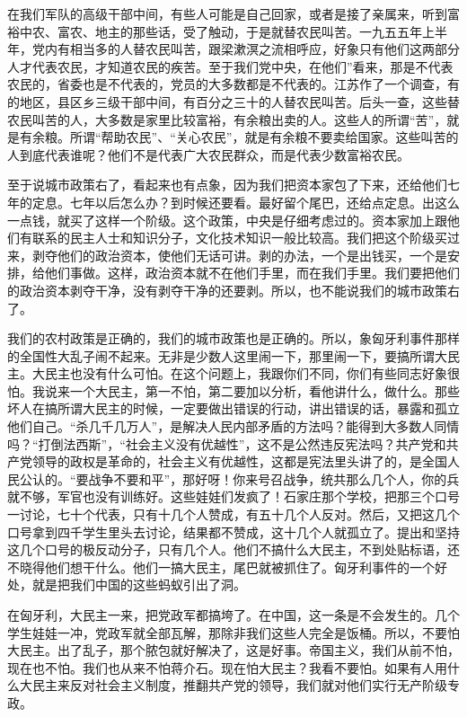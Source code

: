 在我们军队的高级干部中间，有些人可能是自己回家，或者是接了亲属来，听到富裕中农、富农、地主的那些话，受了触动，于是就替农民叫苦。一九五五年上半年，党内有相当多的人替农民叫苦，跟梁漱溟之流相呼应，好象只有他们这两部分人才代表农民，才知道农民的疾苦。至于我们党中央，在他们”看来，那是不代表农民的，省委也是不代表的，党员的大多数都是不代表的。江苏作了一个调查，有的地区，县区乡三级干部中间，有百分之三十的人替农民叫苦。后头一查，这些替农民叫苦的人，大多数是家里比较富裕，有余粮出卖的人。这些人的所谓“苦”，就是有余粮。所谓“帮助农民”、“关心农民”，就是有余粮不要卖给国家。这些叫苦的人到底代表谁呢？他们不是代表广大农民群众，而是代表少数富裕农民。

至于说城市政策右了，看起来也有点象，因为我们把资本家包了下来，还给他们七年的定息。七年以后怎么办？到时候还要看。最好留个尾巴，还给点定息。出这么一点钱，就买了这样一个阶级。这个政策，中央是仔细考虑过的。资本家加上跟他们有联系的民主人士和知识分子，文化技术知识一般比较高。我们把这个阶级买过来，剥夺他们的政治资本，使他们无话可讲。剥的办法，一个是出钱买，一个是安排，给他们事做。这样，政治资本就不在他们手里，而在我们手里。我们要把他们的政治资本剥夺干净，没有剥夺干净的还要剥。所以，也不能说我们的城市政策右了。

我们的农村政策是正确的，我们的城市政策也是正确的。所以，象匈牙利事件那样的全国性大乱子闹不起来。无非是少数人这里闹一下，那里闹一下，要搞所谓大民主。大民主也没有什么可怕。在这个问题上，我跟你们不同，你们有些同志好象很怕。我说来一个大民主，第一不怕，第二要加以分析，看他讲什么，做什么。那些坏人在搞所谓大民主的时候，一定要做出错误的行动，讲出错误的话，暴露和孤立他们自己。“杀几千几万人”，是解决人民内部矛盾的方法吗？能得到大多数人同情吗？“打倒法西斯”，“社会主义没有优越性”，这不是公然违反宪法吗？共产党和共产党领导的政权是革命的，社会主义有优越性，这都是宪法里头讲了的，是全国人民公认的。“要战争不要和平”，那好呀！你来号召战争，统共那么几个人，你的兵就不够，军官也没有训练好。这些娃娃们发疯了！石家庄那个学校，把那三个口号一讨论，七十个代表，只有十几个人赞成，有五十几个人反对。然后，又把这几个口号拿到四千学生里头去讨论，结果都不赞成，这十几个人就孤立了。提出和坚持这几个口号的极反动分子，只有几个人。他们不搞什么大民主，不到处贴标语，还不晓得他们想干什么。他们一搞大民主，尾巴就被抓住了。匈牙利事件的一个好处，就是把我们中国的这些蚂蚁引出了洞。

在匈牙利，大民主一来，把党政军都搞垮了。在中国，这一条是不会发生的。几个学生娃娃一冲，党政军就全部瓦解，那除非我们这些人完全是饭桶。所以，不要怕大民主。出了乱子，那个脓包就好解决了，这是好事。帝国主义，我们从前不怕，现在也不怕。我们也从来不怕蒋介石。现在怕大民主？我看不要怕。如果有人用什么大民主来反对社会主义制度，推翻共产党的领导，我们就对他们实行无产阶级专政。


